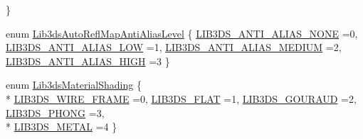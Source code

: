 \begin{DoxyCompactItemize}
 \}
\item 
enum \hyperlink{group__material_ga327a395fb4dcac3a72fffec5bb424634}{Lib3ds\-Auto\-Refl\-Map\-Anti\-Alias\-Level} \{ \hyperlink{group__material_gga327a395fb4dcac3a72fffec5bb424634a7d29ce41b044006a4919c2fa579e2e70}{L\-I\-B3\-D\-S\-\_\-\-A\-N\-T\-I\-\_\-\-A\-L\-I\-A\-S\-\_\-\-N\-O\-N\-E} =0, 
\hyperlink{group__material_gga327a395fb4dcac3a72fffec5bb424634adb01b18ea06dd341332d562aa5fb97e1}{L\-I\-B3\-D\-S\-\_\-\-A\-N\-T\-I\-\_\-\-A\-L\-I\-A\-S\-\_\-\-L\-O\-W} =1, 
\hyperlink{group__material_gga327a395fb4dcac3a72fffec5bb424634abbd6b0e2a23ea881560a80f78b5706f1}{L\-I\-B3\-D\-S\-\_\-\-A\-N\-T\-I\-\_\-\-A\-L\-I\-A\-S\-\_\-\-M\-E\-D\-I\-U\-M} =2, 
\hyperlink{group__material_gga327a395fb4dcac3a72fffec5bb424634aea7ba915de99f1bcf1e8fc8109a43984}{L\-I\-B3\-D\-S\-\_\-\-A\-N\-T\-I\-\_\-\-A\-L\-I\-A\-S\-\_\-\-H\-I\-G\-H} =3
 \}
\item 
enum \hyperlink{group__material_ga02f664edc07cb3d0c34ca56639099cf8}{Lib3ds\-Material\-Shading} \{ \\*
\hyperlink{group__material_gga02f664edc07cb3d0c34ca56639099cf8a8109b9898095b6583e9b3abea3d4ddc5}{L\-I\-B3\-D\-S\-\_\-\-W\-I\-R\-E\-\_\-\-F\-R\-A\-M\-E} =0, 
\hyperlink{group__material_gga02f664edc07cb3d0c34ca56639099cf8ad86611006a7d0e27d419c783f502acd8}{L\-I\-B3\-D\-S\-\_\-\-F\-L\-A\-T} =1, 
\hyperlink{group__material_gga02f664edc07cb3d0c34ca56639099cf8aa4557f1a4533686624bc1fba7cb15568}{L\-I\-B3\-D\-S\-\_\-\-G\-O\-U\-R\-A\-U\-D} =2, 
\hyperlink{group__material_gga02f664edc07cb3d0c34ca56639099cf8a368264bc97185abfdaa39fae1b1b5bc7}{L\-I\-B3\-D\-S\-\_\-\-P\-H\-O\-N\-G} =3, 
\\*
\hyperlink{group__material_gga02f664edc07cb3d0c34ca56639099cf8a06a3d35f91a1cb78c553e300e99733bb}{L\-I\-B3\-D\-S\-\_\-\-M\-E\-T\-A\-L} =4
 \}
\end{DoxyCompactItemize}
